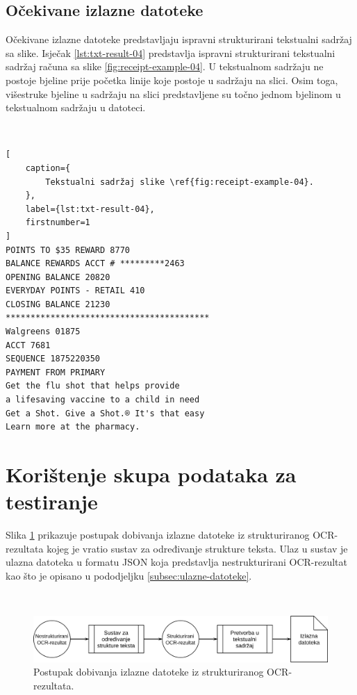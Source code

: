 \documentclass[times, utf8, zavrsni]{fer}
\begin{document}
\subsection{Očekivane izlazne datoteke}
\label{subsec:ocekivane-izlazne-datoteke}
Očekivane izlazne datoteke predstavljaju ispravni strukturirani tekstualni
sadržaj sa slike. Isječak \ref{lst:txt-result-04} predstavlja ispravni
strukturirani tekstualni sadržaj računa sa slike \ref{fig:receipt-example-04}.
U tekstualnom sadržaju ne postoje bjeline prije početka linije koje
postoje u sadržaju na slici. Osim toga, višestruke bjeline u sadržaju na slici
predstavljene su točno jednom bjelinom u tekstualnom sadržaju u datoteci.

\

\begin{lstlisting}[
    caption={
        Tekstualni sadržaj slike \ref{fig:receipt-example-04}.
    },
    label={lst:txt-result-04},
    firstnumber=1
]
POINTS TO $35 REWARD 8770
BALANCE REWARDS ACCT # *********2463
OPENING BALANCE 20820
EVERYDAY POINTS - RETAIL 410
CLOSING BALANCE 21230
*****************************************
Walgreens 01875
ACCT 7681
SEQUENCE 1875220350
PAYMENT FROM PRIMARY
Get the flu shot that helps provide
a lifesaving vaccine to a child in need
Get a Shot. Give a Shot.® It's that easy
Learn more at the pharmacy.
\end{lstlisting}








\section{Korištenje skupa podataka za testiranje}
\label{sec:koristenje-skupa-podataka-za-testiranje}
Slika \ref{fig:sustav-02} prikazuje postupak dobivanja izlazne datoteke iz
strukturiranog OCR-rezultata kojeg je vratio sustav za određivanje strukture
teksta. Ulaz u sustav je ulazna datoteka u formatu JSON koja predstavlja
nestrukturirani OCR-rezultat kao što je opisano u pododjeljku
\ref{subsec:ulazne-datoteke}.

\

\begin{figure}[htb]
    \centering
    \captionsetup{justification=centering,margin=2cm}
    \includegraphics[width=\textwidth]{images/sustav-02.png}
    \caption{
        Postupak dobivanja izlazne datoteke iz strukturiranog OCR-rezultata.
    }
    \label{fig:sustav-02}
\end{figure}
\end{document}
